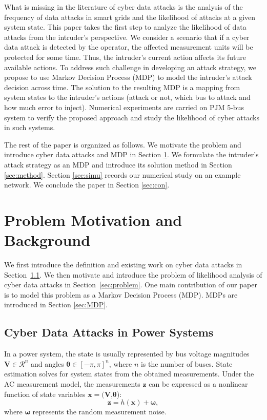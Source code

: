 \documentclass[conference,letterpaper,10pt]{IEEEtran}
\begin{document}
What is missing in the literature of cyber data attacks is the analysis of the frequency of data attacks in smart grids and the likelihood of attacks at a given system state. 
This paper takes the first step to  analyze the likelihood of data attacks from the intruder's perspective. We consider a scenario that  if a cyber data attack is detected by the operator,   the affected measurement units will be protected for some time. Thus, the intruder's current action  affects its future available actions.
To address such challenge in  developing an attack strategy, we propose to use Markov Decision Process (MDP) \cite{MP94} to  model the intruder's attack decision across time. The solution to the resulting MDP
is a mapping from system states to the intruder's actions (attack or not, which bus to attack and how much error to inject). Numerical experiments are carried on PJM 5-bus system to verify the proposed approach and study the likelihood of cyber attacks in such systems. 

The rest of the paper is organized as follows. We motivate the problem and introduce cyber data attacks and MDP in Section \ref{sec:model}. We formulate the intruder's attack strategy as an MDP and introduce its solution method in Section \ref{sec:method}.  Section \ref{sec:simu} records our numerical study on an example network. We conclude the paper in Section \ref{sec:con}. 

\section{Problem Motivation and Background} \label{sec:model}

We first introduce the definition and existing work on cyber data attacks in Section~\ref{sec:cyber}. We then motivate and introduce the problem of likelihood analysis of cyber data attacks in Section~\ref{sec:problem}. One main contribution of our paper is to model this problem as a Markov Decision Process (MDP).  MDPs are introduced in Section \ref{sec:MDP}.
\subsection{Cyber Data Attacks in Power Systems}\label{sec:cyber}
In a power system, the state is usually represented by bus voltage magnitudes $\bm{V}\in \mathcal{R}^n$ and angles $\bm{\theta}\in [-\pi,\pi]^n$, where $n$ is the number of buses. 
State estimation \cite{AE04} solves for system states from the obtained measurements.
Under the AC measurement model, the measurements $\bm{z}$ can be expressed as a nonlinear function of state variables $\bm{x}=(\bm{V}$,$\bm{\theta}$):
\begin{equation}
\bm{z}=h(\bm{x})+\bm{\omega},
\end{equation}
where $\bm{\omega}$ represents the random measurement noise.
\end{document}
